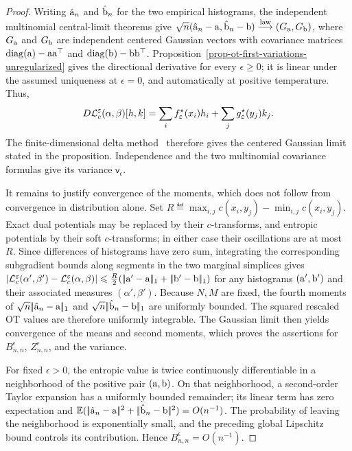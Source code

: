\begin{proof}
	Writing \(\hat{\mathrm{a}}_n\) and \(\hat{\mathrm{b}}_n\) for the two empirical histograms, the independent multinomial central-limit theorems give \(\sqrt n(\hat{\mathrm{a}}_n-\mathrm{a},\hat{\mathrm{b}}_n-\mathrm{b})\overset{\mathrm{law}}{\longrightarrow}(G_{\mathrm{a}},G_{\mathrm{b}})\), where \(G_{\mathrm{a}}\) and \(G_{\mathrm{b}}\) are independent centered Gaussian vectors with covariance matrices \(\operatorname{diag}(\mathrm{a})-\mathrm{a}\mathrm{a}^\top\) and \(\operatorname{diag}(\mathrm{b})-\mathrm{b}\mathrm{b}^\top\). Proposition~\ref{prop-ot-first-variations-unregularized} gives the directional derivative for every \(\epsilon\geq0\); it is linear under the assumed uniqueness at \(\epsilon=0\), and automatically at positive temperature. Thus,
	\[
		D\mathcal{L}_c^\varepsilon(\alpha,\beta)[h,k]
		=
		\sum_i f_\varepsilon^\star(x_i)h_i
		+
		\sum_j g_\varepsilon^\star(y_j)k_j.
	\]
	The finite-dimensional delta method~\cite{vanDerVaartWellner1996} therefore gives the centered Gaussian limit stated in the proposition. Independence and the two multinomial covariance formulas give its variance \(\mathsf{v}_\epsilon\).

	It remains to justify convergence of the moments, which does not follow from convergence in distribution alone. Set \(R\eqdef\max_{i,j}c(x_i,y_j)-\min_{i,j}c(x_i,y_j)\). Exact dual potentials may be replaced by their \(c\)-transforms, and entropic potentials by their soft \(c\)-transforms; in either case their oscillations are at most \(R\). Since differences of histograms have zero sum, integrating the corresponding subgradient bounds along segments in the two marginal simplices gives \(\left\lvert\mathcal{L}_c^\varepsilon(\alpha',\beta')-\mathcal{L}_c^\varepsilon(\alpha,\beta)\right\rvert\leqslant\frac{R}{2}(|\!| \mathrm{a}'-\mathrm{a} |\!|_1+|\!| \mathrm{b}'-\mathrm{b} |\!|_1)\) for any histograms \((\mathrm{a}',\mathrm{b}')\) and their associated measures \((\alpha',\beta')\). Because \(N,M\) are fixed, the fourth moments of \(\sqrt n|\!| \hat{\mathrm{a}}_n-\mathrm{a} |\!|_1\) and \(\sqrt n|\!| \hat{\mathrm{b}}_n-\mathrm{b} |\!|_1\) are uniformly bounded. The squared rescaled OT values are therefore uniformly integrable. The Gaussian limit then yields convergence of the means and second moments, which proves the assertions for \(B_{n,n}^\epsilon\), \(Z_{n,n}^\epsilon\), and the variance.

	For fixed \(\epsilon>0\), the entropic value is twice continuously differentiable in a neighborhood of the positive pair \((\mathrm{a},\mathrm{b})\). On that neighborhood, a second-order Taylor expansion has a uniformly bounded remainder; its linear term has zero expectation and \(\mathbb{E}(|\!| \hat{\mathrm{a}}_n-\mathrm{a} |\!|^2+|\!| \hat{\mathrm{b}}_n-\mathrm{b} |\!|^2)=O(n^{-1})\). The probability of leaving the neighborhood is exponentially small, and the preceding global Lipschitz bound controls its contribution. Hence \(B_{n,n}^\epsilon=O(n^{-1})\).
\end{proof}


